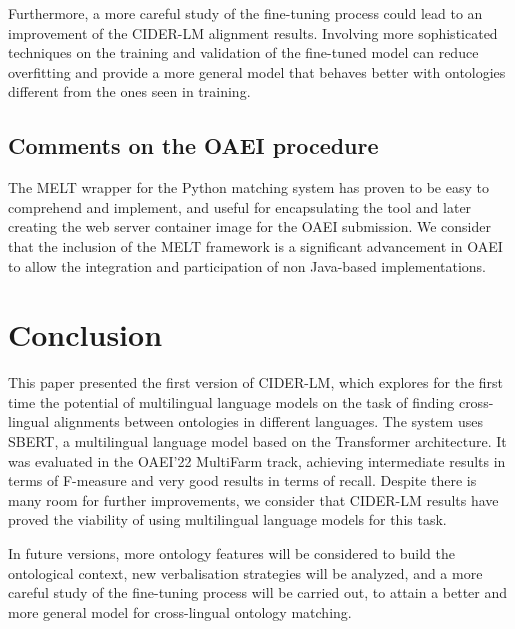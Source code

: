 \documentclass[
]{ceurart}
\begin{document}
Furthermore, a more careful study of the fine-tuning process could lead to an improvement of the CIDER-LM alignment results. Involving more sophisticated techniques on the training and validation of the fine-tuned model can reduce overfitting and provide a more general model that behaves better with ontologies different from the ones seen in training.


\subsection{Comments on the OAEI procedure}

The MELT wrapper for the Python matching system has proven to be easy to comprehend and implement, and useful for encapsulating the tool and later creating the web server container image for the OAEI submission. We consider that the inclusion of the MELT framework is a significant advancement in OAEI to allow the integration and participation of non Java-based implementations.

\section{Conclusion}

This paper presented the first version of CIDER-LM, which explores for the first time the potential of multilingual language models on the task of finding cross-lingual alignments between ontologies in different languages. %
The system uses SBERT, a multilingual language model based on the Transformer architecture. It was evaluated in the OAEI'22 MultiFarm track, achieving intermediate results in terms of F-measure and very good results in terms of recall. Despite there is many room for further improvements, we consider that CIDER-LM results have proved the viability of using multilingual language models for this task. 

In future versions, more ontology features will be considered to build the ontological context, new verbalisation strategies will be analyzed, and a more careful study of the fine-tuning process will be carried out, to attain a better and more general model for cross-lingual ontology matching.
\end{document}
